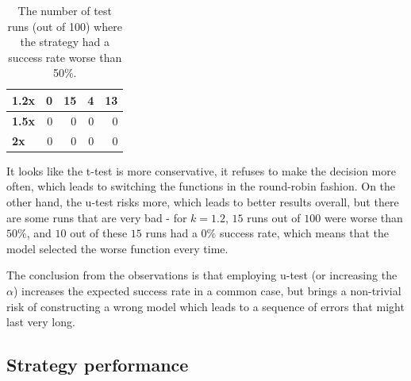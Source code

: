 \begin{table}[h!]
\begin{tabular}{|l|r|r|r|r|}
		\textbf{1.2x}  & 0                                                                                 & 15                                                                                & 4                                                                                 & 13                                                                                \\ \hline
		\textbf{1.5x}  & 0                                                                                 & 0                                                                                 & 0                                                                                 & 0                                                                                 \\ \hline
		\textbf{2x}    & 0                                                                                 & 0                                                                                 & 0                                                                                 & 0                                                                                 \\ \hline
	\end{tabular}
\egroup
\caption{The number of test runs (out of 100) where the strategy had a success rate worse than 50\%.}
\label{tab:strategy_comparison_mean_based_worse_runs}
\end{table}

It looks like the t-test is more conservative, it refuses to make the decision more often, which leads to switching the functions in the round-robin fashion. On the other hand, the u-test risks more, which leads to better results overall, but there are some runs that are very bad - for $k=1.2$, $15$ runs out of $100$ were worse than $50\%$, and $10$ out of these $15$ runs had a $0\%$ success rate, which means that the model selected the worse function every time.

The conclusion from the observations is that employing u-test (or increasing the $\alpha$) increases the expected success rate in a common case, but brings a non-trivial risk of constructing a wrong model which leads to a sequence of errors that might last very long.

\subsection{Strategy performance}
\label{subsec:strategy_perf}

